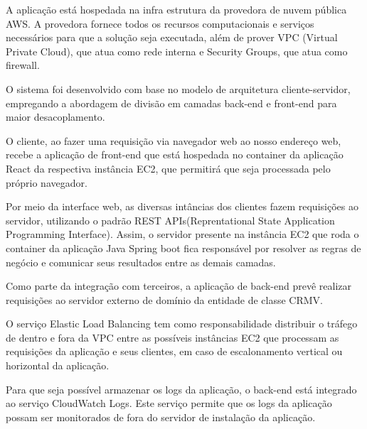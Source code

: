 \documentclass[
    12pt,               %
    openright,          %
    oneside,
    a4paper,            %
    BIBLATEX,           %
    TODO,               %
    english,            %
    brazil              %
    ]{ifsp-spo-inf-ctds}
\begin{document}
        
        


        A aplicação está hospedada na infra estrutura da provedora de nuvem pública AWS. A provedora fornece todos os recursos computacionais e serviços necessários para que a solução seja executada, além de prover VPC (Virtual Private Cloud), que atua como rede interna e Security Groups, que atua como firewall.
        
        O sistema foi desenvolvido com base no modelo de arquitetura cliente-servidor, empregando a abordagem de divisão em camadas back-end e front-end para maior desacoplamento.
        
        O cliente, ao fazer uma requisição via navegador web ao nosso endereço web, recebe a aplicação de front-end que está hospedada no container da aplicação React da respectiva instância EC2, que permitirá que seja processada pelo próprio navegador.
        
        Por meio da interface web, as diversas intâncias dos clientes fazem requisições ao servidor, utilizando o padrão REST APIs(Reprentational State Application Programming Interface).
        Assim, o servidor presente na instância EC2 que roda o container da aplicação Java Spring boot fica responsável por resolver as regras de negócio e comunicar seus resultados entre as demais camadas.
        
        Como parte da integração com terceiros, a aplicação de back-end prevê realizar requisições ao servidor externo de domínio da entidade de classe CRMV.
           
        O serviço Elastic Load Balancing tem como responsabilidade distribuir o tráfego de dentro e fora da VPC entre as possíveis instâncias EC2 que processam as requisições da aplicação e seus clientes, em caso de escalonamento vertical ou horizontal da aplicação.
        
        Para que seja possível armazenar os logs da aplicação, o back-end está integrado ao serviço CloudWatch Logs. Este serviço permite que os logs da aplicação possam ser monitorados de fora do servidor de instalação da aplicação.
        
\end{document}
